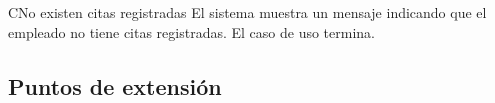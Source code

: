 \begin{UCtrayectoriaA}{C}{No existen citas registradas}
	\UCpaso El sistema muestra un mensaje indicando que el empleado no tiene citas registradas.
	\UCpaso El caso de uso termina.
\end{UCtrayectoriaA}

\subsection{Puntos de extensión}

